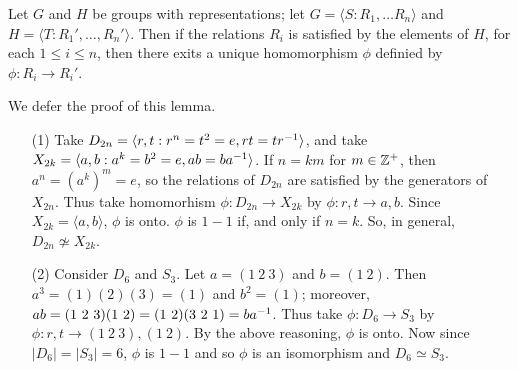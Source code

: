 \begin{lemma}\label{lemma_1.5.4}
  Let $G$ and  $H$ be groups with representations; let  $G=\langle S : R_1,
  \dots R_n \rangle$ and $H=\langle T : R_1', \dots, R_n'\rangle$. Then if the
  relations $R_i$ is satisfied by the elements of $H$, for each  $1 \leq i
  \leq n$, then there exits a unique homomorphism  $\phi$ definied by
  $\phi:R_i \rightarrow R_i'$.
\end{lemma}
\begin{remark}
  We defer the proof of this lemma.
\end{remark}

\begin{example}\label{example_1.14}
  \begin{enumerate}
    \item[(1)] Take $D_{2n}=\langle r,t : r^n=t^2=e, rt=tr^{-1} \rangle$, and
      take $X_{2k}=\langle a,b : a^k=b^2=e, ab=ba^{-1} \rangle$. If $n=km$ for  $m
      \in \mathbb{Z}^+$, then  $a^n=(a^k)^m=e$, so the relations of $D_{2n}$ are
      satisfied by the generators of $X_{2n}$. Thus take homomorhism
      $\phi:D_{2n} \rightarrow X_{2k}$ by $\phi:r,t \rightarrow a,b$.
      Since $X_{2k}=\langle a, b \rangle$, $\phi$ is onto.  $\phi$ is $1-1$
      if, and only if  $n=k$. So, in general, $D_{2n} \not\simeq X_{2k}$.

    \item[(2)] Consider $D_6$ and  $S_3$. Let $a=(1 \ 2 \ 3)$ and $b=(1 \
      2)$. Then $a^3=(1)(2)(3)=(1)$ and $b^2=(1)$; moreover, $ab=(1 \ 2 \
      3)(1 \ 2)=(1 \ 2)(3 \ 2 \ 1)=ba^{-1}$. Thus take $\phi:D_6
      \rightarrow S_3$ by $\phi:r,t \rightarrow (1 \ 2 \ 3), (1 \ 2)$. By
      the above reasoning,  $\phi$ is onto. Now since
      $|D_6|=|S_3|=6$, $\phi$ is  $1-1$ and so  $\phi$ is an
      isomorphism and  $D_6 \simeq S_3$.
  \end{enumerate}
\end{example}

